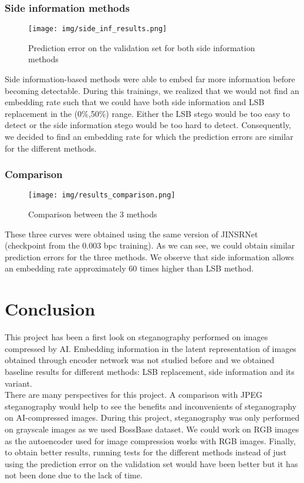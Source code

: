 \documentclass[12pt]{article}
\begin{document}
\subsubsection{Side information methods}
\begin{figure}[H]
    \texttt{[image: img/side\_inf\_results.png]}
    \caption[Side information methods results]{Prediction error on the validation set for both side information methods}
    \label{fig:side_inf_results}
\end{figure}
Side information-based methods were able to embed far more information before becoming detectable. During this trainings, we realized that we would not find an embedding rate such that we could have both side information and LSB replacement in the (0\%,50\%) range. Either the LSB stego would be too easy to detect or the side information stego would be too hard to detect. Consequently, we decided to find an embedding rate for which the prediction errors are similar for the different methods.

\subsubsection{Comparison}
\begin{figure}[H]
    \texttt{[image: img/results\_comparison.png]}
    \caption[Comparative results]{Comparison between the 3 methods}
    \label{fig:results_comparison}
\end{figure}
These three curves were obtained using the same version of JINSRNet (checkpoint from the 0.003 bpc training). As we can see, we could obtain similar prediction errors for the three methods. We observe that side information allows an embedding rate approximately 60 times higher than LSB method.

\clearpage
\section{Conclusion}
This project has been a first look on steganography performed on images compressed by AI. Embedding information in the latent representation of images obtained through encoder network was not studied before and we obtained baseline results for different methods: LSB replacement, side information and its variant.\\
There are many perspectives for this project. A comparison with JPEG steganography  would help to see the benefits and inconvenients of steganography on AI-compressed images. During this project, steganography was only performed on grayscale images as we used BossBase dataset. We could work on RGB images as the autoencoder used for image compression works with RGB images. Finally, to obtain better results, running tests for the different methods instead of just using the prediction error on the validation set would have been better but it has not been done due to the lack of time.

\clearpage
\printbibliography
\end{document}
